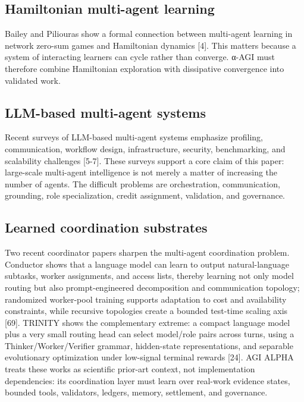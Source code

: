\documentclass[11pt]{article}
\begin{document}
\subsection{Hamiltonian multi-agent learning}\label{hamiltonian-multi-agent-learning}

Bailey and Piliouras show a formal connection between multi-agent learning in network zero-sum games and Hamiltonian dynamics {[}4{]}. This matters because a system of interacting learners can cycle rather than converge. α-AGI must therefore combine Hamiltonian exploration with dissipative convergence into validated work.

\subsection{LLM-based multi-agent systems}\label{llm-based-multi-agent-systems}

Recent surveys of LLM-based multi-agent systems emphasize profiling, communication, workflow design, infrastructure, security, benchmarking, and scalability challenges {[}5-7{]}. These surveys support a core claim of this paper: large-scale multi-agent intelligence is not merely a matter of increasing the number of agents. The difficult problems are orchestration, communication, grounding, role specialization, credit assignment, validation, and governance.

\subsection{Learned coordination substrates}\label{learned-coordination-substrates}

Two recent coordinator papers sharpen the multi-agent coordination problem. Conductor shows that a language model can learn to output natural-language subtasks, worker assignments, and access lists, thereby learning not only model routing but also prompt-engineered decomposition and communication topology; randomized worker-pool training supports adaptation to cost and availability constraints, while recursive topologies create a bounded test-time scaling axis {[}69{]}. TRINITY shows the complementary extreme: a compact language model plus a very small routing head can select model/role pairs across turns, using a Thinker/Worker/Verifier grammar, hidden-state representations, and separable evolutionary optimization under low-signal terminal rewards {[}24{]}. AGI ALPHA treats these works as scientific prior-art context, not implementation dependencies: its coordination layer must learn over real-work evidence states, bounded tools, validators, ledgers, memory, settlement, and governance.
\end{document}

